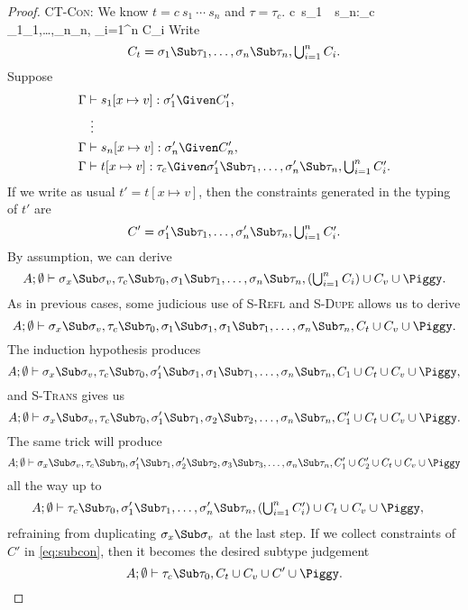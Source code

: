 \documentclass{amsart}
\theoremstyle{definition}
\begin{document}
\begin{proof}
\Case\textsc{CT-Con}: We know $t=c~s_1~\cdots~s_n$
and $\tau=\tau_c$.
%
{\Gamma\vdash c~s_1~\cdots~s_n:\tau_c\Given
\sigma_1\Sub\tau_1,\ldots,\sigma_n\Sub\tau_n,
{\textstyle\bigcup_{i=1}^n C_i}
}
%
Write
\[
C_t=\sigma_1\Sub\tau_1,\ldots,\sigma_n\Sub\tau_n,
{\textstyle\bigcup_{i=1}^n C_i}.
\]
Suppose
\begin{align*}
\Gamma&\vdash s_1[x\mapsto v]:\sigma_1'\Given C_1',\\
&~\vdots\\
\Gamma&\vdash s_n[x\mapsto v]:\sigma_n'\Given C_n',\\
\Gamma&\vdash t[x\mapsto v]:\tau_c\Given
\sigma_1'\Sub\tau_1,\ldots,\sigma_n'\Sub\tau_n,
{\textstyle\bigcup_{i=1}^n C_i'}.
\end{align*}
If we write as usual $t'=t[x\mapsto v]$, then the constraints
generated in the typing of $t'$ are
\[
C'=\sigma_1'\Sub\tau_1,\ldots,\sigma_n'\Sub\tau_n,
{\textstyle\bigcup_{i=1}^n C_i'}.
\]
By assumption, we can derive
\[
A;\emptyset\vdash \sigma_x\Sub\sigma_v,\tau_c\Sub\tau_0,
\sigma_1\Sub\tau_1,\ldots,\sigma_n\Sub\tau_n,
({\textstyle\bigcup_{i=1}^n C_i})
\cup C_v\cup\Piggy.
\]
As in previous cases, some judicious use of \textsc{S-Refl} and
\textsc{S-Dupe} allows us to derive
\[
A;\emptyset\vdash \sigma_x\Sub\sigma_v,\tau_c\Sub\tau_0,
\sigma_1\Sub\sigma_1,
\sigma_1\Sub\tau_1,\ldots,\sigma_n\Sub\tau_n,
C_t\cup C_v\cup\Piggy.
\]
The induction hypothesis produces
\[
A;\emptyset\vdash \sigma_x\Sub\sigma_v,\tau_c\Sub\tau_0,
\sigma_1'\Sub\sigma_1,
\sigma_1\Sub\tau_1,\ldots,\sigma_n\Sub\tau_n,
C_1\cup C_t\cup C_v\cup\Piggy,
\]
and \textsc{S-Trans} gives us
\[
A;\emptyset\vdash \sigma_x\Sub\sigma_v,\tau_c\Sub\tau_0,
\sigma_1'\Sub\tau_1,
\sigma_2\Sub\tau_2,\ldots,\sigma_n\Sub\tau_n,
C_1'\cup
C_t\cup C_v\cup
\Piggy.
\]
The same trick will produce
\[
A;\emptyset\vdash \sigma_x\Sub\sigma_v,\tau_c\Sub\tau_0,
\sigma_1'\Sub\tau_1,
\sigma_2'\Sub\tau_2,
\sigma_3\Sub\tau_3,
\ldots,\sigma_n\Sub\tau_n,
C_1'\cup C_2'\cup
C_t\cup C_v\cup\Piggy
\]
all the way up to
\begin{align}
A;\emptyset&\vdash \tau_c\Sub\tau_0,
\sigma_1'\Sub\tau_1,\ldots,\sigma_n'\Sub\tau_n,
({\textstyle\bigcup_{i=1}^nC_i'})\cup
C_t\cup C_v\cup\Piggy,
\label{eq:subcon}
\end{align}
refraining from duplicating $\sigma_x\Sub\sigma_v$ at the last
step. If we collect constraints of $C'$ in \eqref{eq:subcon},
then it becomes the desired subtype judgement
\[
A;\emptyset\vdash \tau_c\Sub\tau_0,
C_t\cup C_v\cup C'\cup\Piggy.
\]
\end{proof}
\end{document}
